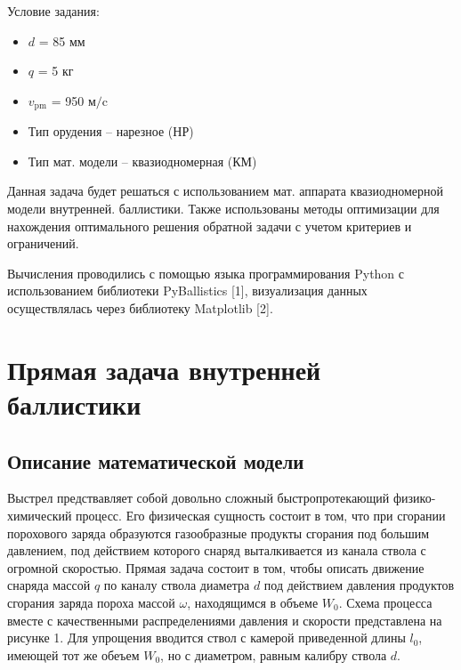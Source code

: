 \documentclass[14pt, a4paper]{report} %
\begin{document}
Условие задания: 
\begin{itemize}
    \item $d$ = 85 мм
    \item $q$ = 5 кг
    \item $v_{\text{pm}}$ = 950 $\text{м/c}$
    \item Тип орудения -- нарезное (НР)
    \item Тип мат. модели -- квазиодномерная (КМ)
\end{itemize}

Данная задача будет решаться с использованием мат. аппарата квазиодномерной модели внутренней.
баллистики. Также использованы методы оптимизации для нахождения оптимального решения обратной задачи с учетом критериев и ограничений.

Вычисления проводились с помощью языка программирования Python с использованием библиотеки PyBallistics [1], визуализация данных осуществлялась 
через библиотеку Matplotlib [2].

\newpage
\chapter{Прямая задача внутренней баллистики}
\section{Описание математической модели}

Выстрел предствавляет собой довольно сложный быстропротекающий физико-химический процесс. Его физическая сущность состоит в том, что при сгорании порохового заряда образуются газообразные продукты сгорания под большим давлением, 
под действием которого снаряд выталкивается из канала ствола с огромной скоростью. Прямая задача состоит в том, чтобы описать движение снаряда массой $q$ по каналу ствола диаметра $d$ под действием давления продуктов сгорания заряда пороха массой $\omega$, находящимся в объеме $W_0$. Схема процесса вместе с качественными распределениями давления и скорости представлена на рисунке 1.
Для упрощения вводится ствол с камерой приведенной длины $l_0$, имеющей тот же обеъем $W_0$, но с диаметром, равным калибру ствола $d$. 
\end{document}
